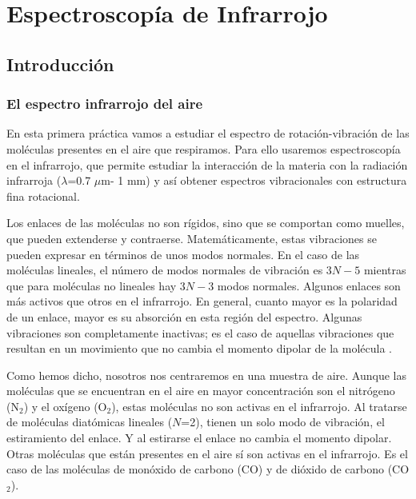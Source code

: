 \documentclass{tufte-book}
\begin{document}




\chapter[Infrarrojo]{Espectroscopía de Infrarrojo}
\section{Introducción}
\subsection{El espectro infrarrojo del aire}
En esta primera práctica vamos a estudiar el espectro de rotación-vibración
de las moléculas presentes en el aire que respiramos. Para ello usaremos
espectroscopía en el infrarrojo, que permite estudiar la interacción de la
materia con la radiación infrarroja ($\lambda$=0.7 $\mu$m- 1 mm) y así obtener
espectros vibracionales con estructura fina rotacional. 

Los enlaces de las moléculas no son rígidos, sino que se comportan como 
muelles, que pueden extenderse y contraerse. Matemáticamente, estas vibraciones
se pueden expresar en términos de unos modos normales. En el caso de las moléculas
lineales, el número de modos normales de vibración es $3N-5$ mientras que para 
moléculas no lineales hay $3N-3$ modos normales. Algunos enlaces son más 
activos que otros en el infrarrojo. En general, cuanto mayor es la polaridad 
de un enlace, mayor es su absorción en esta región del espectro. Algunas 
vibraciones son completamente inactivas; es el caso de aquellas vibraciones
que resultan en un movimiento que no cambia el momento dipolar de la  
molécula . 

Como hemos dicho, nosotros nos centraremos en una muestra de aire. Aunque 
las moléculas que se encuentran en el aire en mayor concentración son 
el nitrógeno (N$_2$) y el oxígeno (O$_2$), estas moléculas no son activas 
en el infrarrojo. Al tratarse de moléculas diatómicas lineales ($N$=2), 
tienen un solo modo de vibración, el estiramiento del enlace. Y al estirarse
el enlace no cambia el momento dipolar. Otras moléculas que están presentes
en el aire sí son activas en el infrarrojo. Es el caso de las moléculas de
monóxido de carbono (CO) y de dióxido de carbono (CO$_2$).
\end{document}
